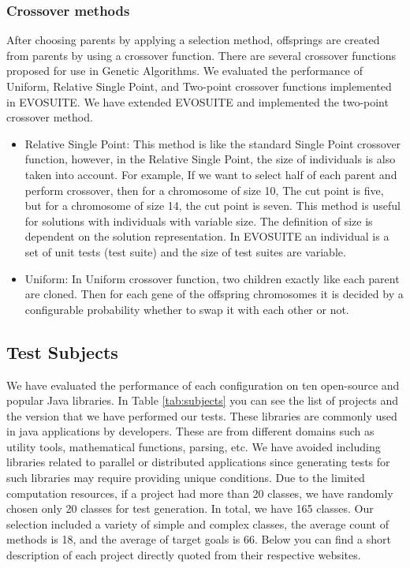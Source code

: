 \documentclass[sigconf]{acmart}
\begin{document}
\subsubsection{Crossover methods}
After choosing parents by applying a selection method, offsprings are created from parents by using a
crossover function. There are several crossover functions proposed for use in Genetic Algorithms. We evaluated
the performance of Uniform, Relative Single Point, and Two-point crossover functions implemented in EVOSUITE. We have 
extended EVOSUITE and implemented the two-point crossover method.
\begin{itemize}
  \item{Relative Single Point}: This method is like the standard Single Point crossover function,
  however, in the Relative Single Point, the size of individuals is also taken into account. For example, If we want
  to select half of each parent and perform crossover, then for a chromosome of size 10, The cut point is five,
  but for a chromosome of size 14, the cut point is seven. This method is useful for solutions with individuals
  with variable size. The definition of size is dependent on the solution representation. In EVOSUITE
  an individual is a set of unit tests (test suite) and the size of test suites are variable.
  \item{Uniform}: In Uniform crossover function, two children exactly like each parent are cloned. Then for each
  gene of the offspring chromosomes it is decided by a configurable probability whether to swap it with each other or not.
\end{itemize}


\subsection{Test Subjects}
\label{testsubjects}
We have evaluated the performance of each configuration on ten open-source and popular Java libraries.
In Table \ref{tab:subjects} you can see the list of projects and the version that we have performed 
our tests. These libraries are commonly used in java applications by developers. These are 
from different domains such as utility tools, mathematical functions, parsing, etc. 
We have avoided including libraries related to parallel or distributed applications since
generating tests for such libraries may require providing unique conditions. Due to the limited computation resources,
if a project had more than 20 classes, we have randomly chosen only 20 classes for test generation.
In total, we have 165 classes. Our selection included a variety of simple and complex classes, 
the average count of methods is 18, and the average of target goals is 66. Below you can find a short 
description of each project directly quoted from their respective websites.
\end{document}
